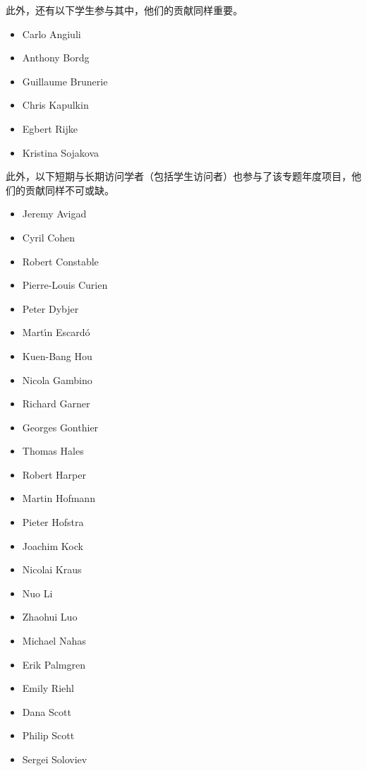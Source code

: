 \noindent 此外，还有以下学生参与其中，他们的贡献同样重要。

\begin{multicols}{\OPTprefacecols}{
\begin{itemize}
\item[] Carlo Angiuli
\item[] Anthony Bordg
\item[] Guillaume Brunerie
\item[] Chris Kapulkin
\item[] Egbert Rijke
\item[] Kristina Sojakova
\end{itemize}
}
\end{multicols}

\noindent 此外，以下短期与长期访问学者（包括学生访问者）也参与了该专题年度项目，他们的贡献同样不可或缺。

\begin{multicols}{\OPTprefacecols}{
\begin{itemize}
\item[] Jeremy Avigad
\item[] Cyril Cohen
\item[] Robert Constable
\item[] Pierre-Louis Curien
\item[] Peter Dybjer
\item[] Mart{\'\i}n Escard{\'o}
\item[] Kuen-Bang Hou
\item[] Nicola Gambino
\item[] Richard Garner
\item[] Georges Gonthier
\item[] Thomas Hales
\item[] Robert Harper
\item[] Martin Hofmann
\item[] Pieter Hofstra
\item[] Joachim Kock
\item[] Nicolai Kraus
\item[] Nuo Li
\item[] Zhaohui Luo
\item[] Michael Nahas
\item[] Erik Palmgren
\item[] Emily Riehl
\item[] Dana Scott
\item[] Philip Scott
\item[] Sergei Soloviev
\end{itemize}
}
\end{multicols}

